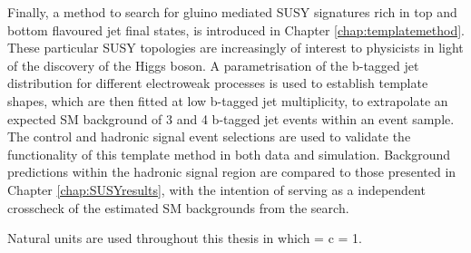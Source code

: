 Finally, a method to search for gluino mediated \ac{SUSY} signatures rich in top and bottom flavoured jet final states, is introduced in Chapter \ref{chap:templatemethod}. These particular \ac{SUSY} topologies are increasingly of interest to physicists in light of the discovery of the Higgs boson. A parametrisation of the b-tagged jet distribution for different electroweak processes is used to establish template shapes, which are then fitted at low b-tagged jet multiplicity,  to extrapolate an expected \ac{SM} background of 3 and 4 b-tagged jet events within an event sample. The \alphat control and hadronic signal event selections are used to validate the functionality of this template method in both data and simulation. Background predictions within the hadronic signal region are compared to those presented in Chapter \ref{chap:SUSYresults}, with the intention of serving as a independent crosscheck of the estimated \ac{SM} backgrounds from the \alphat search. 

Natural units are used throughout this thesis in which \hbarred = c = 1.
